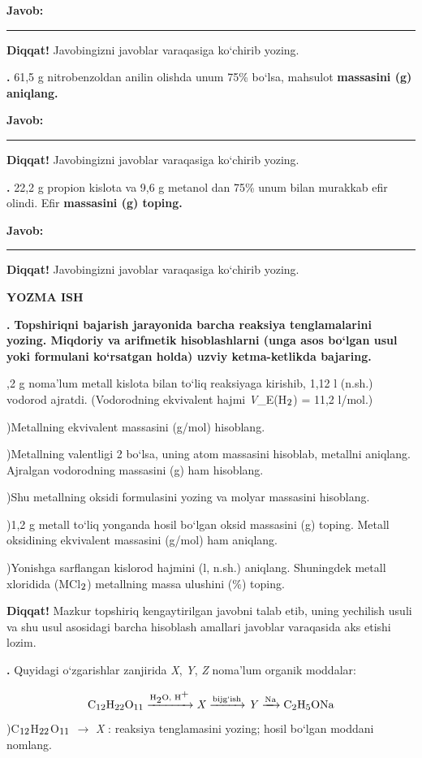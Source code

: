 \documentclass[11pt,a4paper]{article}
\renewcommand{\textsubscript}[1]{\ensuremath{_{\text{\fontsize{8}{8}\selectfont #1}}}}
\renewcommand{\textsuperscript}[1]{\ensuremath{^{\text{\fontsize{8}{8}\selectfont #1}}}}
\newcommand{\qn}[1]{\textbf{\fontsize{11.5}{13}\selectfont #1}}
\newcommand{\qsep}{\par\vspace{1pt}\noindent\rule{0pt}{0.4pt}\par\vspace{5pt}}
\newcommand{\diqqat}[1]{\par\smallskip\noindent\textbf{Diqqat!} #1\par\medskip}
\newcommand{\javob}{\par\smallskip\noindent\textbf{Javob:} \rule[-2pt]{7.5cm}{0.4pt}\par\smallskip\noindent\textbf{Diqqat!} Javobingizni javoblar varaqasiga ko`chirib yozing.\par\medskip}
\begin{document}
\javob\qsep
\noindent\qn{39.} 61,5 g nitrobenzoldan anilin olishda unum 75\% bo`lsa, mahsulot \textbf{massasini (g) aniqlang.}
\javob\qsep
\noindent\qn{40.} 22,2 g propion kislota va 9,6 g metanol dan 75\% unum bilan murakkab efir olindi. Efir \textbf{massasini (g) toping.}
\javob\qsep
\par\bigskip\begin{center}\textbf{\fontsize{13}{15}\selectfont YOZMA ISH}\end{center}
\noindent\qn{41.} \textbf{Topshiriqni bajarish jarayonida barcha reaksiya tenglamalarini yozing. Miqdoriy va arifmetik hisoblashlarni (unga asos bo`lgan usul yoki formulani ko`rsatgan holda) uzviy ketma-ketlikda bajaring.}\par{},2 g noma'lum metall kislota bilan to`liq reaksiyaga kirishib, 1,12 l (n.sh.) vodorod ajratdi. (Vodorodning ekvivalent hajmi \textit{V}\_E(H\textsubscript{2}) = 11,2 l/mol.)\par
{})Metallning ekvivalent massasini (g/mol) hisoblang.\par
{})Metallning valentligi 2 bo`lsa, uning atom massasini hisoblab, metallni aniqlang. Ajralgan vodorodning massasini (g) ham hisoblang.\par
{})Shu metallning oksidi formulasini yozing va molyar massasini hisoblang.\par
{})1,2 g metall to`liq yonganda hosil bo`lgan oksid massasini (g) toping. Metall oksidining ekvivalent massasini (g/mol) ham aniqlang.\par
{})Yonishga sarflangan kislorod hajmini (l, n.sh.) aniqlang. Shuningdek metall xloridida (MCl\textsubscript{2}) metallning massa ulushini (\%) toping.\par
\diqqat{Mazkur topshiriq kengaytirilgan javobni talab etib, uning yechilish usuli va shu usul asosidagi barcha hisoblash amallari javoblar varaqasida aks etishi lozim.}\qsep
\noindent\qn{42.} Quyidagi o`zgarishlar zanjirida \textit{X}, \textit{Y}, \textit{Z} noma'lum organik moddalar:\par
\[\setlength{\fboxsep}{0pt}\text{C\textsubscript{12}H\textsubscript{22}O\textsubscript{11}}\xrightarrow{\text{H\textsubscript{2}O, H\textsuperscript{+}}}\text{\textit{X}}\xrightarrow{\text{bijg`ish}}\text{\textit{Y}}\xrightarrow{\text{Na}}\text{C\textsubscript{2}H\textsubscript{5}ONa}\]
)C\textsubscript{12}H\textsubscript{22}O\textsubscript{11} $\to$ \textit{X} : reaksiya tenglamasini yozing; hosil bo`lgan moddani nomlang.\par
\end{document}
